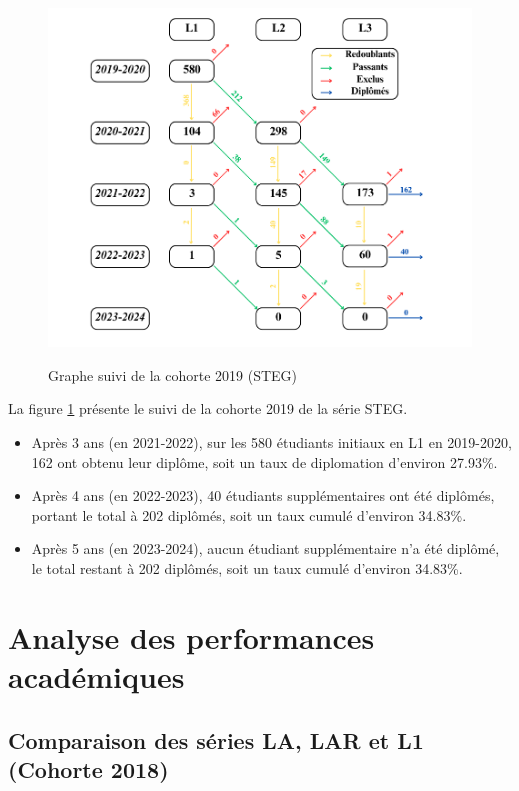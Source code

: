 \begin{figure}[ht]
    \centering
    \caption{Graphe suivi de la cohorte 2019 (STEG)}
    \includegraphics[width=1\textwidth]{figure/STEG_2019.png}
    \label{fig:cohorte_steg_2019}
\end{figure}

La figure \ref{fig:cohorte_steg_2019} présente le suivi de la cohorte 2019 de la série STEG.
\begin{itemize}
    \item Après 3 ans (en 2021-2022), sur les 580 étudiants initiaux en L1 en 2019-2020, 162 ont obtenu leur diplôme, soit un taux de diplomation d'environ 27.93\%.
    \item Après 4 ans (en 2022-2023), 40 étudiants supplémentaires ont été diplômés, portant le total à 202 diplômés, soit un taux cumulé d'environ 34.83\%.
    \item Après 5 ans (en 2023-2024), aucun étudiant supplémentaire n'a été diplômé, le total restant à 202 diplômés, soit un taux cumulé d'environ 34.83\%.
\end{itemize}

\newpage
\section{Analyse des performances académiques}

\subsection{Comparaison des séries LA, LAR et L1 (Cohorte 2018)}

